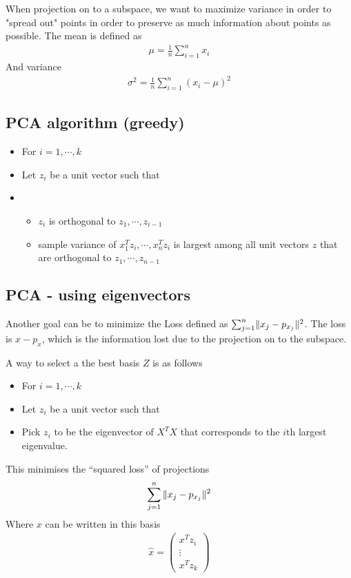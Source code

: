 \documentclass{article}
\begin{document}
  When projection on to a subspace, we want to maximize variance in order to "spread out" points in order to preserve as much information about points as possible. The mean is defined as 
  \begin{align}
    \mu = \frac{1}{n}\sum_{i=1}^{n}x_i
  \end{align}
  And variance 
  \begin{align}
    \sigma^2 = \frac{1}{n}\sum_{i=1}^{n}{(x_i - \mu)^2} 
  \end{align}

  \subsection{PCA algorithm (greedy)}
  \begin{itemize}
    \item For $i = 1, \cdots, k$
    \item Let $z_i$ be a unit vector such that 
    \item \begin{itemize}
      \item $z_i$ is orthogonal to $z_1, \cdots, z_{i-1}$
      \item sample variance of $x_1^T z_i, \cdots, x_n^T z_i$ is largest among all unit vectors $z$ that are orthogonal to $z_1, \cdots, z_{n-1}$
    \end{itemize}
  \end{itemize}
  
  \subsection{PCA - using eigenvectors}
  Another goal can be to minimize the Loss defined as $\sum_{j=1}^n\lVert x_j-p_{x_j} \rVert^2$. 
  The loss is $x - p_x$, which is the information lost due to the projection on to the subspace.
  
  A way to select a the best basis $Z$ is as follows              
  \begin{itemize}
    \item For $i = 1, \cdots, k$
    \item Let $z_i$ be a unit vector such that 
    \item \begin{itemize}
      Pick $z_i$ to be the eigenvector of $X^TX$ that corresponds to the $i$th largest eigenvalue.
    \end{itemize}
  \end{itemize}
  This minimises the ``squared loss'' of projections 
  \begin{align}
    \sum_{j=1}^{n}{\lVert x_j - p_{x_j} \rVert^2}
  \end{align}
  Where $x$ can be written in this basis
  \begin{align}
    \hat{x} = \begin{pmatrix}
      x^T z_i\\
      \vdots\\
      x^T z_k
    \end{pmatrix}
  \end{align}
  
\end{document}

